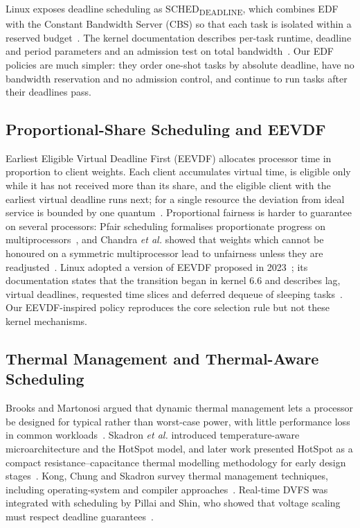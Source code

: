\documentclass[conference]{IEEEtran}
\begin{document}
Linux exposes deadline scheduling as SCHED\textsubscript{DEADLINE}, which combines EDF with the Constant Bandwidth Server (CBS) so that each task is isolated within a reserved budget~\cite{abeni1998,lelli2016}. The kernel documentation describes per-task runtime, deadline and period parameters and an admission test on total bandwidth~\cite{kdoc_deadline}. Our EDF policies are much simpler: they order one-shot tasks by absolute deadline, have no bandwidth reservation and no admission control, and continue to run tasks after their deadlines pass.

\subsection{Proportional-Share Scheduling and EEVDF}\label{sec:rw-fair}
Earliest Eligible Virtual Deadline First (EEVDF) allocates processor time in proportion to client weights. Each client accumulates virtual time, is eligible only while it has not received more than its share, and the eligible client with the earliest virtual deadline runs next; for a single resource the deviation from ideal service is bounded by one quantum~\cite{stoica1995}. Proportional fairness is harder to guarantee on several processors: Pfair scheduling formalises proportionate progress on multiprocessors~\cite{baruah1996}, and Chandra \emph{et al.} showed that weights which cannot be honoured on a symmetric multiprocessor lead to unfairness unless they are readjusted~\cite{chandra2000}. Linux adopted a version of EEVDF proposed in 2023~\cite{corbet2023}; its documentation states that the transition began in kernel 6.6 and describes lag, virtual deadlines, requested time slices and deferred dequeue of sleeping tasks~\cite{kdoc_eevdf}. Our EEVDF-inspired policy reproduces the core selection rule but not these kernel mechanisms.

\subsection{Thermal Management and Thermal-Aware Scheduling}\label{sec:rw-thermal}
Brooks and Martonosi argued that dynamic thermal management lets a processor be designed for typical rather than worst-case power, with little performance loss in common workloads~\cite{brooks2001}. Skadron \emph{et al.} introduced temperature-aware microarchitecture and the HotSpot model, and later work presented HotSpot as a compact resistance--capacitance thermal modelling methodology for early design stages~\cite{skadron2003,huang2006}. Kong, Chung and Skadron survey thermal management techniques, including operating-system and compiler approaches~\cite{kong2012}. Real-time DVFS was integrated with scheduling by Pillai and Shin, who showed that voltage scaling must respect deadline guarantees~\cite{pillai2001}.
\end{document}
